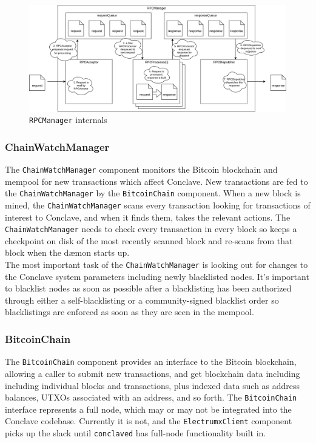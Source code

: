\documentclass{report}
\begin{document}
			\begin{figure}[H]
				\begin{center}
				\includegraphics[width=400pt]{img/rpc-queues.png}
				\end{center}
				\caption{\texttt{RPCManager} internals}
				\label{fig:rpcManager}
			\end{figure}
	
			\subsubsection{ChainWatchManager}
			The \texttt{ChainWatchManager} component monitors the Bitcoin blockchain and mempool  for new transactions which affect Conclave. New transactions are fed to the \texttt{ChainWatchManager} by the \texttt{BitcoinChain} component. When a new block is mined, the \texttt{ChainWatchManager} scans every transaction looking for transactions of interest to Conclave, and when it finds them, takes the relevant actions. The \texttt{ChainWatchManager} needs to check every transaction in every block so keeps a checkpoint on disk of the most recently scanned block and re-scans from that block when the dæmon starts up. \\
			
			The most important task of the \texttt{ChainWatchManager} is looking out for changes to the Conclave system parameters including newly blacklisted nodes. It's important to blacklist nodes as soon as possible after a blacklisting has been authorized through either a self-blacklisting or a community-signed blacklist order so blacklistings are enforced as soon as they are seen in the mempool.
			\subsubsection{BitcoinChain}
			The \texttt{BitcoinChain} component provides an interface to the Bitcoin blockchain, allowing a caller to submit new transactions, and get blockchain data including including individual blocks and transactions, plus indexed data such as address balances, UTXOs associated with an address, and so forth. The \texttt{BitcoinChain} interface represents a full node, which may or may not be integrated into the Conclave codebase. Currently it is not, and the \texttt{ElectrumxClient} component picks up the slack until \texttt{conclaved} has full-node functionality built in. \\
			
\end{document}
